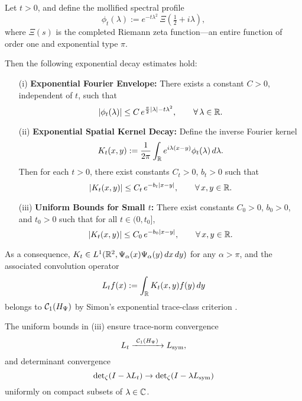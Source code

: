 \begin{lemma}
\label{lem:decay_mollified_kernel}
Let \( t > 0 \), and define the mollified spectral profile
\[
\phi_t(\lambda) := e^{-t\lambda^2} \, \Xi\left(\tfrac{1}{2} + i\lambda\right),
\]
where \( \Xi(s) \) is the completed Riemann zeta function—an entire function of order one and exponential type \( \pi \).

Then the following exponential decay estimates hold:
\begin{enumerate}
    \item[\textup{(i)}] \textbf{Exponential Fourier Envelope:} There exists a constant \( C > 0 \), independent of \( t \), such that
    \[
    |\phi_t(\lambda)| \le C \, e^{\frac{\pi}{2}|\lambda| - t\lambda^2}, \qquad \forall\, \lambda \in \mathbb{R}.
    \]

    \item[\textup{(ii)}] \textbf{Exponential Spatial Kernel Decay:} Define the inverse Fourier kernel
    \[
    K_t(x,y) := \frac{1}{2\pi} \int_{\mathbb{R}} e^{i\lambda(x - y)} \phi_t(\lambda)\,d\lambda.
    \]
    Then for each \( t > 0 \), there exist constants \( C_t > 0 \), \( b_t > 0 \) such that
    \[
    |K_t(x,y)| \le C_t\, e^{-b_t |x - y|}, \qquad \forall\, x, y \in \mathbb{R}.
    \]

    \item[\textup{(iii)}] \textbf{Uniform Bounds for Small \( t \):} There exist constants \( C_0 > 0 \), \( b_0 > 0 \), and \( t_0 > 0 \) such that for all \( t \in (0, t_0] \),
    \[
    |K_t(x,y)| \le C_0\, e^{-b_0 |x - y|}, \qquad \forall\, x, y \in \mathbb{R}.
    \]
\end{enumerate}

\noindent
As a consequence, \( K_t \in L^1(\mathbb{R}^2, \Psi_\alpha(x)\Psi_\alpha(y)\, dx\,dy) \) for any \( \alpha > \pi \), and the associated convolution operator
\[
L_t f(x) := \int_{\mathbb{R}} K_t(x,y) f(y)\, dy
\]
belongs to \( \mathcal{C}_1(H_{\Psi}) \) by Simon’s exponential trace-class criterion \cite[Thm.~4.2]{Simon2005TraceIdeals}.

\medskip
\noindent
The uniform bounds in \textup{(iii)} ensure trace-norm convergence
\[
L_t \xrightarrow{\ \mathcal{C}_1(\HPsi)\ } L_{\sym},
\]
and determinant convergence
\[
\det\nolimits_\zeta(I - \lambda L_t) \to \det\nolimits_\zeta(I - \lambda L_{\mathrm{sym}})
\]
uniformly on compact subsets of \( \lambda \in \mathbb{C} \).
\end{lemma}
